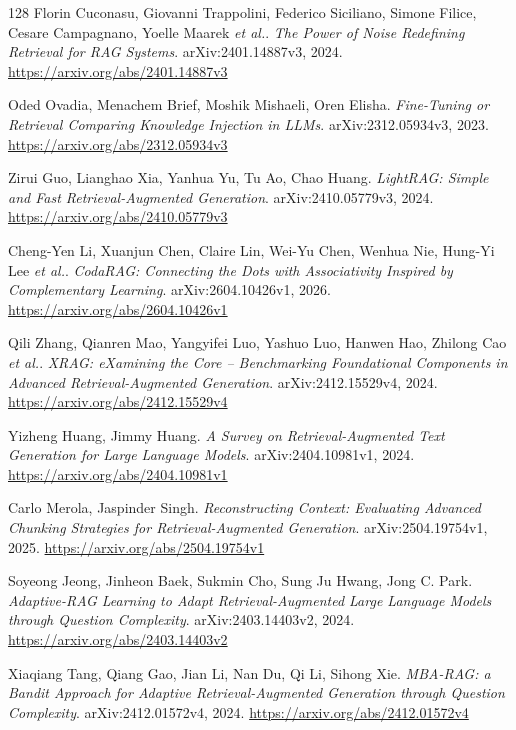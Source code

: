 \documentclass[11pt,a4paper]{article}
\begin{document}
\begin{thebibliography}{128}
Florin Cuconasu, Giovanni Trappolini, Federico Siciliano, Simone Filice, Cesare Campagnano, Yoelle Maarek \emph{et al.}.
\newblock \emph{The Power of Noise Redefining Retrieval for RAG Systems}.
\newblock arXiv:2401.14887v3, 2024.
\newblock \url{https://arxiv.org/abs/2401.14887v3}

Oded Ovadia, Menachem Brief, Moshik Mishaeli, Oren Elisha.
\newblock \emph{Fine-Tuning or Retrieval Comparing Knowledge Injection in LLMs}.
\newblock arXiv:2312.05934v3, 2023.
\newblock \url{https://arxiv.org/abs/2312.05934v3}

Zirui Guo, Lianghao Xia, Yanhua Yu, Tu Ao, Chao Huang.
\newblock \emph{LightRAG: Simple and Fast Retrieval-Augmented Generation}.
\newblock arXiv:2410.05779v3, 2024.
\newblock \url{https://arxiv.org/abs/2410.05779v3}

Cheng-Yen Li, Xuanjun Chen, Claire Lin, Wei-Yu Chen, Wenhua Nie, Hung-Yi Lee \emph{et al.}.
\newblock \emph{CodaRAG: Connecting the Dots with Associativity Inspired by Complementary Learning}.
\newblock arXiv:2604.10426v1, 2026.
\newblock \url{https://arxiv.org/abs/2604.10426v1}

Qili Zhang, Qianren Mao, Yangyifei Luo, Yashuo Luo, Hanwen Hao, Zhilong Cao \emph{et al.}.
\newblock \emph{XRAG: eXamining the Core -- Benchmarking Foundational Components in Advanced Retrieval-Augmented Generation}.
\newblock arXiv:2412.15529v4, 2024.
\newblock \url{https://arxiv.org/abs/2412.15529v4}

Yizheng Huang, Jimmy Huang.
\newblock \emph{A Survey on Retrieval-Augmented Text Generation for Large Language Models}.
\newblock arXiv:2404.10981v1, 2024.
\newblock \url{https://arxiv.org/abs/2404.10981v1}

Carlo Merola, Jaspinder Singh.
\newblock \emph{Reconstructing Context: Evaluating Advanced Chunking Strategies for Retrieval-Augmented Generation}.
\newblock arXiv:2504.19754v1, 2025.
\newblock \url{https://arxiv.org/abs/2504.19754v1}

Soyeong Jeong, Jinheon Baek, Sukmin Cho, Sung Ju Hwang, Jong C. Park.
\newblock \emph{Adaptive-RAG Learning to Adapt Retrieval-Augmented Large Language Models through Question Complexity}.
\newblock arXiv:2403.14403v2, 2024.
\newblock \url{https://arxiv.org/abs/2403.14403v2}

Xiaqiang Tang, Qiang Gao, Jian Li, Nan Du, Qi Li, Sihong Xie.
\newblock \emph{MBA-RAG: a Bandit Approach for Adaptive Retrieval-Augmented Generation through Question Complexity}.
\newblock arXiv:2412.01572v4, 2024.
\newblock \url{https://arxiv.org/abs/2412.01572v4}


\end{thebibliography}
\end{document}
